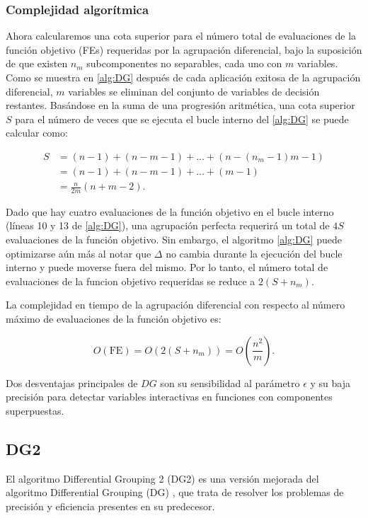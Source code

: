 \subsubsection{Complejidad algorítmica}
Ahora calcularemos una cota superior para el número total de evaluaciones de la función objetivo (FEs) requeridas por la agrupación diferencial, bajo la suposición de que existen \(n_m\) subcomponentes no separables, cada uno con \(m\) variables. Como se muestra en \ref{alg:DG} después de cada aplicación exitosa de la agrupación diferencial, \(m\) variables se eliminan del conjunto de variables de decisión restantes. Basándose en la suma de una progresión aritmética, una cota superior \(S\) para el número de veces que se ejecuta el bucle interno del \ref{alg:DG} se puede calcular como:

\begin{align}
    S &= (n - 1) + (n - m - 1) + \ldots + \left(n - (n_m - 1)m - 1\right) \nonumber \\
    &= (n - 1) + (n - m - 1) + \ldots + (m - 1) \nonumber \\
    &= \frac{n}{2m}(n + m - 2).
\end{align}


Dado que hay cuatro evaluaciones de la función objetivo en el bucle interno (líneas 10 y 13 de \ref{alg:DG}), una agrupación perfecta requerirá un total de \(4S\) evaluaciones de la función objetivo. Sin embargo, el algoritmo \ref{alg:DG} puede optimizarse aún más al notar que \(\Delta\) no cambia durante la ejecución del bucle interno y puede moverse fuera del mismo. Por lo tanto, el número total de evaluaciones de la funcion objetivo requeridas se reduce a \(2(S + n_m)\).

La complejidad en tiempo de la agrupación diferencial con respecto al número máximo de evaluaciones de la función objetivo es:

\[
O(\text{FE}) = O\left(2(S + n_m)\right) = O\left(\frac{n^2}{m}\right).
\]


Dos desventajas principales de \(DG\) son su sensibilidad al parámetro \(\epsilon\) y su baja precisión para detectar variables interactivas en funciones con componentes superpuestas.

\subsection{DG2}
El algoritmo Differential Grouping 2 (DG2) \cite{DG2} es una versión mejorada del algoritmo Differential Grouping (DG) \cite{DG}, que trata de resolver los problemas de precisión y eficiencia presentes en su predecesor.

